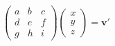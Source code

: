 \documentclass[preview]{standalone}
\begin{document}
\begin{align*}
\begin{pmatrix} a & b & c \\ d & e & f \\ g & h & i \end{pmatrix} \begin{pmatrix} x \\ y \\ z \end{pmatrix} = \mathbf{v}'
\end{align*}
\end{document}
